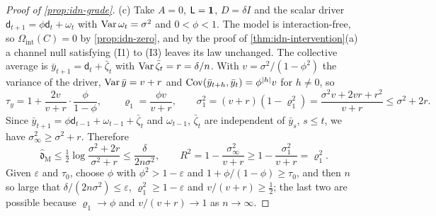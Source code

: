 \begin{proof}[Proof of \cref{prop:idn-grade}]
(c) Take $A=0$, $\mathsf L=\mathbf{1}$, $D=\delta I$ and the scalar driver $\mathsf d_{t+1}=\phi\mathsf d_t+\omega_t$ with $\operatorname{Var}\omega_t=\sigma^2$ and $0<\phi<1$. The model is interaction-free, so $\Omega_{\mathrm{int}}(C)=0$ by \cref{prop:idn-zero}, and by the proof of \cref{thm:idn-intervention}(a) a channel null satisfying (I1) to (I3) leaves its law unchanged. The collective average is $\bar y_{t+1}=\mathsf d_t+\bar\zeta_t$ with $\operatorname{Var}\bar\zeta_t=r=\delta/n$. With $v=\sigma^2/(1-\phi^2)$ the variance of the driver, $\operatorname{Var}\bar y=v+r$ and $\operatorname{Cov}(\bar y_{t+h},\bar y_t)=\phi^{|h|}v$ for $h\neq0$, so
\begin{equation}\label{eq:idn-tau}
\tau_y=1+\frac{2v}{v+r}\cdot\frac{\phi}{1-\phi},\qquad\varrho_1=\frac{\phi v}{v+r},\qquad\sigma_1^2=(v+r)(1-\varrho_1^2)=\frac{\sigma^2v+2vr+r^2}{v+r}\le\sigma^2+2r.
\end{equation}
Since $\bar y_{t+1}=\phi\mathsf d_{t-1}+\omega_{t-1}+\bar\zeta_t$ and $\omega_{t-1}$, $\bar\zeta_t$ are independent of $\bar y_s$, $s\le t$, we have $\sigma_\infty^2\ge\sigma^2+r$. Therefore
\begin{equation}\label{eq:idn-grade-bounds}
\hat{\mathfrak d}_{\mathrm M}\le\tfrac12\log\frac{\sigma^2+2r}{\sigma^2+r}\le\frac{\delta}{2n\sigma^2},\qquad R^2=1-\frac{\sigma_\infty^2}{v+r}\ge1-\frac{\sigma_1^2}{v+r}=\varrho_1^2.
\end{equation}
Given $\varepsilon$ and $\tau_0$, choose $\phi$ with $\phi^2>1-\varepsilon$ and $1+\phi/(1-\phi)\ge\tau_0$, and then $n$ so large that $\delta/(2n\sigma^2)\le\varepsilon$, $\varrho_1^2\ge1-\varepsilon$ and $v/(v+r)\ge\tfrac12$; the last two are possible because $\varrho_1\to\phi$ and $v/(v+r)\to1$ as $n\to\infty$.
\end{proof}

